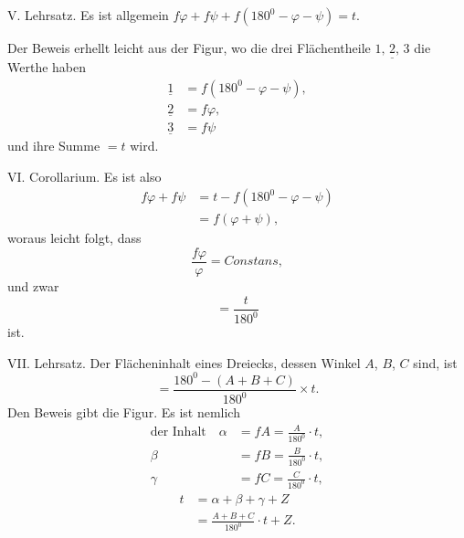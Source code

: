 %
V. Lehrsatz. Es ist allgemein $f\varphi+f\psi+f(180^{0}-\varphi-\psi)=t$.

Der Beweis erhellt leicht aus der Figur, wo die drei Flächentheile $\underline{1,\,2,\,3}$ die Werthe haben
\[
\begin{aligned}
\underline{1}&=f(180^{0}-\varphi-\psi),\\
\underline{2}&=f\varphi,\\
\underline{3}&=f\psi
\end{aligned}
\]
und ihre Summe $=t$ wird.
\begin{center}\end{center}

VI. Corollarium. Es ist also
\[
\begin{aligned}
f\varphi+f\psi&=t-f(180^{0}-\varphi-\psi)\\
&=f(\varphi+\psi),
\end{aligned}
\]
woraus leicht folgt, dass
\[
\frac{f\varphi}{\varphi}=\mathit{Constans},
\]
und zwar
\[
=\frac{t}{180^{0}}
\]
ist.

VII. Lehrsatz. Der Flächeninhalt eines Dreiecks, dessen Winkel $A$, $B$, $C$ sind, ist
\[
=\frac{180^{0}-(A+B+C)}{180^{0}}\times t.
\]
Den Beweis gibt die Figur. Es ist nemlich
\[
\begin{aligned}
\text{der Inhalt}\quad\alpha&=fA=\frac{A}{180^{0}}\cdot t,\\
\beta&=fB=\frac{B}{180^{0}}\cdot t,\\
\gamma&=fC=\frac{C}{180^{0}}\cdot t,
\end{aligned}
\]
\[
\begin{aligned}
t&=\alpha+\beta+\gamma+Z\\
&=\frac{A+B+C}{180^{0}}\cdot t+Z.
\end{aligned}
\]
\begin{center}\end{center}


